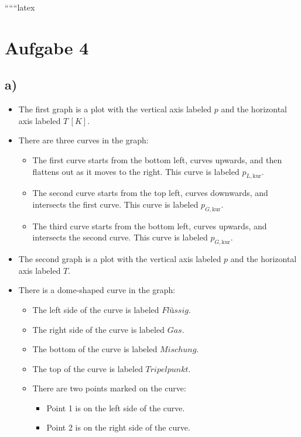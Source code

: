 
``````latex


\section*{Aufgabe 4}

\subsection*{a)}

\begin{itemize}
    \item The first graph is a plot with the vertical axis labeled \( p \) and the horizontal axis labeled \( T \, [K] \).
    \item There are three curves in the graph:
        \begin{itemize}
            \item The first curve starts from the bottom left, curves upwards, and then flattens out as it moves to the right. This curve is labeled \( p_{L, \text{kur}} \).
            \item The second curve starts from the top left, curves downwards, and intersects the first curve. This curve is labeled \( p_{G, \text{kur}} \).
            \item The third curve starts from the bottom left, curves upwards, and intersects the second curve. This curve is labeled \( p_{G, \text{kur}} \).
        \end{itemize}
\end{itemize}

\begin{itemize}
    \item The second graph is a plot with the vertical axis labeled \( p \) and the horizontal axis labeled \( T \).
    \item There is a dome-shaped curve in the graph:
        \begin{itemize}
            \item The left side of the curve is labeled \( Flüssig \).
            \item The right side of the curve is labeled \( Gas \).
            \item The bottom of the curve is labeled \( Mischung \).
            \item The top of the curve is labeled \( Tripelpunkt \).
            \item There are two points marked on the curve:
                \begin{itemize}
                    \item Point 1 is on the left side of the curve.
                    \item Point 2 is on the right side of the curve.
                \end{itemize}
        \end{itemize}
\end{itemize}

